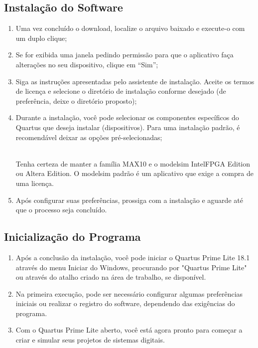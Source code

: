 \documentclass[12pt,a4paper]{article}
\newcommand{\Version}{18.1}
\newcommand{\Atention}[1]{
    \begin{tcolorbox}[colback=red!5!white,colframe=red!75!black]
    \begin{center}
    \faExclamationTriangle{}\\#1
    \end{center}
    \end{tcolorbox}
}
\begin{document}
\subsection{Instalação do Software}

\begin{enumerate}
    \item Uma vez concluído o download, localize o arquivo baixado e execute-o com um duplo clique;
    \item Se for exibida uma janela pedindo permissão para que o aplicativo faça alterações no seu dispositivo, clique em ``Sim'';
    \item Siga as instruções apresentadas pelo assistente de instalação. Aceite os termos de licença e selecione o diretório de instalação conforme desejado (de preferência, deixe o diretório proposto);
    \item Durante a instalação, você pode selecionar os componentes específicos do Quartus que deseja instalar (dispositivos). Para uma instalação padrão, é recomendável deixar as opções pré-selecionadas;
    
    \Atention{Tenha certeza de manter a família MAX10 e o modelsim IntelFPGA Edition ou Altera Edition. O modelsim padrão é um aplicativo que exige a compra de uma licença.}

    \item Após configurar suas preferências, prossiga com a instalação e aguarde até que o processo seja concluído. %
\end{enumerate}

\subsection{Inicialização do Programa}

\begin{enumerate}
    \item Após a conclusão da instalação, você pode iniciar o Quartus Prime Lite \Version{} através do menu Iniciar do Windows, procurando por "Quartus Prime Lite" ou através do atalho criado na área de trabalho, se disponível.
    \item Na primeira execução, pode ser necessário configurar algumas preferências iniciais ou realizar o registro do software, dependendo das exigências do programa.
    \item Com o Quartus Prime Lite aberto, você está agora pronto para começar a criar e simular seus projetos de sistemas digitais.
\end{enumerate}
\end{document}
